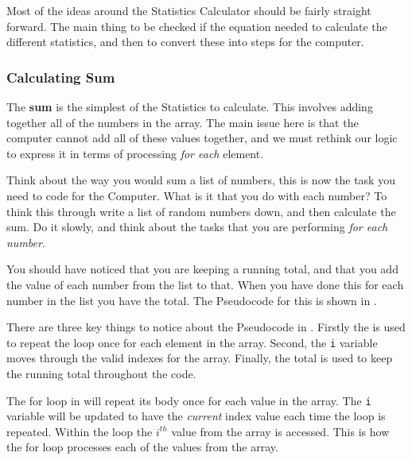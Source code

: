 Most of the ideas around the Statistics Calculator should be fairly straight forward. The main thing to be checked if the equation needed to calculate the different statistics, and then to convert these into steps for the computer.

\subsubsection{Calculating Sum} %
\label{ssub:calculating_sum}

The \textbf{sum} is the simplest of the Statistics to calculate. This involves adding together all of the numbers in the array. The main issue here is that the computer cannot add all of these values together, and we must rethink our logic to express it in terms of processing \emph{for each} element.

Think about the way you would sum a list of numbers, this is now the task you need to code for the Computer. What is it that you do with each number? To think this through write a list of random numbers down, and then calculate the sum. Do it slowly, and think about the tasks that you are performing \emph{for each number}.

You should have noticed that you are keeping a running total, and that you add the value of each number from the list to that. When you have done this for each number in the list you have the total. The Pseudocode for this is shown in .




There are three key things to notice about the Pseudocode in . Firstly the  is used to repeat the loop once for each element in the array. Second, the \texttt{i} variable moves through the valid indexes for the array. Finally, the total is used to keep the running total throughout the code.

The for loop in  will repeat its body once for each value in the array. The \texttt{i} variable will be updated to have the \emph{current} index value each time the loop is repeated. Within the loop the $i^{th}$ value from the array is accessed. This is how the for loop processes each of the values from the array.

